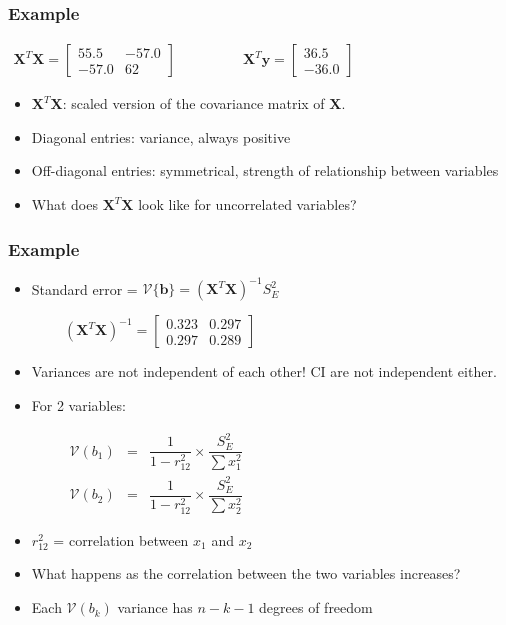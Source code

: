\begin{frame}\frametitle{Example}
	
	$ 
	\begin{array}{lr}
		\mathbf{X}^T\mathbf{X} = 
		\begin{bmatrix}
			55.5 & -57.0 \\-57.0 & 62
		\end{bmatrix}
		&\qquad\qquad \mathbf{X}^T\mathbf{y} = 
		\begin{bmatrix}
			36.5 \\
			-36.0 
		\end{bmatrix}
	\end{array}
	$
	\begin{itemize}
		\item	$\mathbf{X}^T\mathbf{X}$: scaled version of the covariance matrix of $\mathbf{X}$. 
		\item	Diagonal entries: variance, always positive 
		\item	Off-diagonal entries: symmetrical, strength of relationship between variables 
		\item	What does $\mathbf{X}^T\mathbf{X}$ look like for uncorrelated variables? 
	\end{itemize}
\end{frame}

\begin{frame}\frametitle{Example}
	\begin{itemize}
		\item	Standard error = $\mathcal{V}\{\mathbf{b}\} = \left( \mathbf{X}^T\mathbf{X} \right)^{-1} S_E^2$ 
	\end{itemize}
	
	$ \qquad\qquad \left(\mathbf{X}^T\mathbf{X}\right)^{-1}= 
	\begin{bmatrix}
		0.323 & 0.297 \\
		0.297 & 0.289 
	\end{bmatrix}
	$
	\begin{itemize}
		\item	Variances are not independent of each other! CI are not independent either. 
		\item	For 2 variables: 
	\end{itemize}
	
	$ 
	\begin{array}{lcr}
		\qquad\qquad \mathcal{V}\left(b_1\right) &=& \dfrac{1}{1-r^2_{12}} \times \dfrac{S_E^2}{\sum{x_1^2}} \\
		\qquad\qquad \mathcal{V}\left(b_2\right) &=& \dfrac{1}{1-r^2_{12}} \times \dfrac{S_E^2}{\sum{x_2^2}} 
	\end{array}
	$
	\begin{itemize}
		\item	$r^2_{12}$ = correlation between $x_1$ and $x_2$ 
		\item	What happens as the correlation between the two variables increases? 
		\item	Each $\mathcal{V}\left(b_k\right)$ variance has $n-k-1$ degrees of freedom 
	\end{itemize}
\end{frame}

